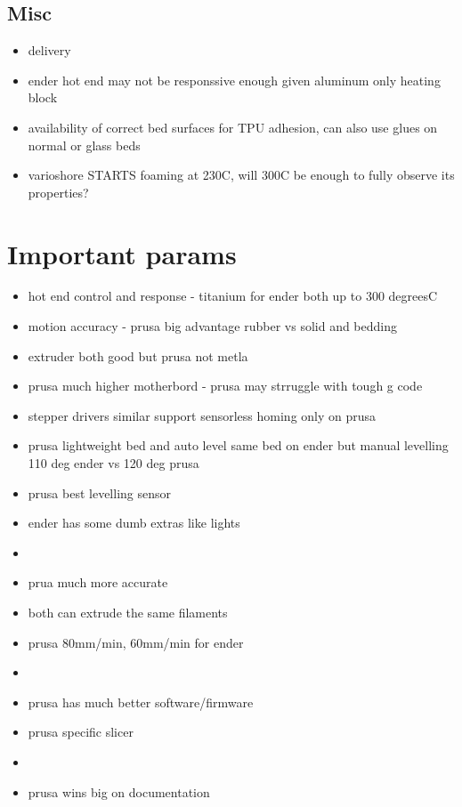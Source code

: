 \documentclass[11pt]{article}
\begin{document}
\subsection{Misc}
\label{sec:org85cfdfa}
\begin{itemize}
\item delivery
\item ender hot end may not be responssive enough given aluminum only heating block
\item availability of correct bed surfaces for TPU adhesion, can also use glues on normal or glass beds
\item varioshore STARTS foaming at 230C, will 300C be enough to fully observe its properties?
\end{itemize}

\section{Important params}
\label{sec:org83be7a1}
\begin{itemize}
\item hot end control and response - titanium for ender both up to 300 degreesC
\item motion accuracy - prusa big advantage rubber vs solid and bedding
\item extruder both good but prusa not metla
\item prusa much higher motherbord - prusa may strruggle with tough g code
\item stepper drivers similar support sensorless homing only on prusa
\item prusa lightweight bed and auto level same bed on ender but manual levelling 110 deg ender vs 120 deg prusa
\item prusa best levelling sensor
\item ender has some dumb extras like lights
\item 

\item prua much more accurate
\item both can extrude the same filaments
\item prusa 80mm/min, 60mm/min for ender
\item 

\item prusa has much better software/firmware
\item prusa specific slicer
\item 

\item prusa wins big on documentation
\end{itemize}
\end{document}
